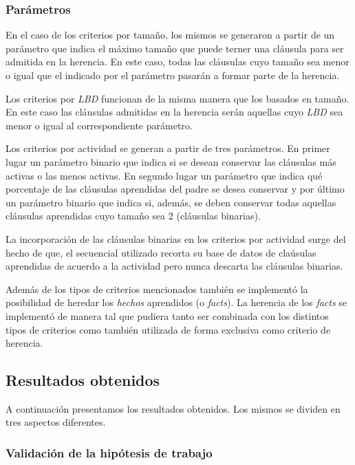 \subsubsection{Parámetros}

En el caso de los criterios por tamaño, los mismos se generaron a partir de un
parámetro que indica el máximo tamaño que puede terner una cláusula para ser
admitida en la herencia. En este caso, todas las cláusulas cuyo tamaño sea
menor o igual que el indicado por el parámetro pasarán a formar parte de la
herencia.

Los criterios por \emph{LBD} funcionan de la misma manera que los basados en
tamaño. En este caso las cláusulas admitidas en la herencia serán aquellas
cuyo \emph{LBD} sea menor o igual al correspondiente parámetro.

Los criterios por actividad se generan a partir de tres parámetros. En primer
lugar un parámetro binario que indica si se desean conservar las cláusulas más
activas o las menos activas. En segundo lugar un parámetro que indica qué
porcentaje de las cláusulas aprendidas del padre se desea conservar y por
último un parámetro binario que indica si, además, se deben conservar todas
aquellas cláusulas aprendidas cuyo tamaño sea 2 (cláusulas binarias).

La incorporación de las cláusulas binarias en los criterios por actividad
surge del hecho de que, el \ssolver secuencial utilizado recorta su base de
datos de claúsulas aprendidas de acuerdo a la actividad pero nunca descarta
las cláusulas binarias.

Además de los tipos de criterios mencionados también se implementó la
posibilidad de heredar los \emph{hechos} aprendidos (o \emph{facts}). La
herencia de los \emph{facts} se implementó de manera tal que pudiera tanto ser
combinada con los distintos tipos de criterios como también utilizada de forma
exclusiva como criterio de herencia.




\subsection{Resultados obtenidos}

A continuación presentamos los resultados obtenidos. Los mismos se dividen en
tres aspectos diferentes. 

\subsubsection{Validación de la hipótesis de trabajo}

